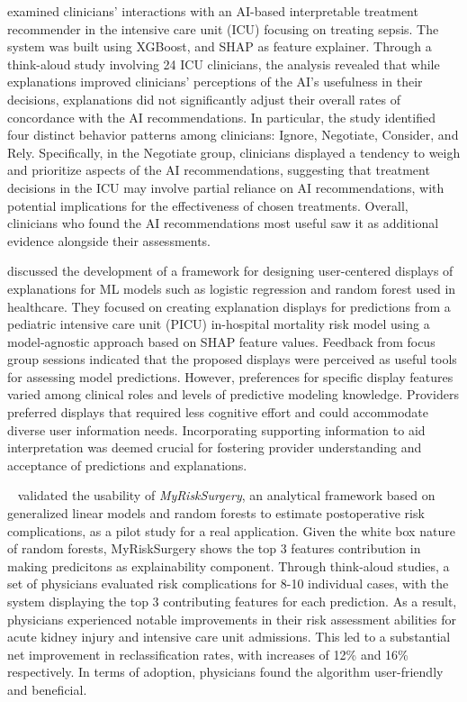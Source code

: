 \cite{sivaraman2023ignore} examined clinicians' interactions with an AI-based interpretable treatment recommender in the intensive care unit (ICU) focusing on treating sepsis. The system was built using XGBoost, and SHAP as feature explainer. 
Through a think-aloud study involving 24 ICU clinicians, the analysis revealed that while explanations improved clinicians' perceptions of the AI's usefulness in their decisions, explanations did not significantly adjust their overall rates of concordance with the AI recommendations. In particular, the study identified four distinct behavior patterns among clinicians: Ignore, Negotiate, Consider, and Rely. Specifically, in the Negotiate group, clinicians displayed a tendency to weigh and prioritize aspects of the AI recommendations, suggesting that treatment decisions in the ICU may involve partial reliance on AI recommendations, with potential implications for the effectiveness of chosen treatments. Overall, clinicians who found the AI recommendations most useful saw it as additional evidence alongside their assessments.



\cite{barda2020qualitative} discussed the development of a framework for designing user-centered displays of explanations for ML models such as logistic regression and random forest used in healthcare. 
They focused on creating explanation displays for predictions from a pediatric intensive care unit (PICU) in-hospital mortality risk model using a model-agnostic approach based on SHAP feature values. 
Feedback from focus group sessions indicated that the proposed displays were perceived as useful tools for assessing model predictions. However, preferences for specific display features varied among clinical roles and levels of predictive modeling knowledge. 
Providers preferred displays that required less cognitive effort and could accommodate diverse user information needs. Incorporating supporting information to aid interpretation was deemed crucial for fostering provider understanding and acceptance of predictions and explanations. 



~\cite{brennan2019comparing} validated the usability of \textit{MyRiskSurgery}, an analytical framework based on generalized linear models and random forests to estimate postoperative risk complications, as a pilot study for a real application. Given the white box nature of random forests, MyRiskSurgery shows the top 3 features contribution in making predicitons as explainability component. 
Through think-aloud studies, a set of physicians evaluated risk complications for 8-10 individual cases, with the system displaying the top 3 contributing features for each prediction. As a result, physicians experienced notable improvements in their risk assessment abilities for acute kidney injury and intensive care unit admissions. This led to a substantial net improvement in reclassification rates, with increases of 12\% and 16\% respectively. In terms of adoption, physicians found the algorithm user-friendly and beneficial.



